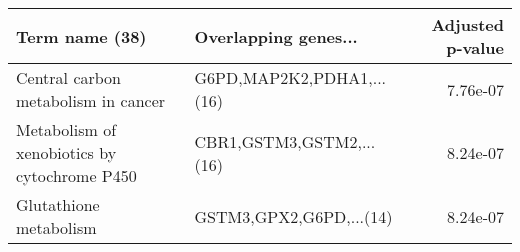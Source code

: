 \begin{tabular}{llr}
\toprule
                              Term name (38) &      Overlapping genes... &  Adjusted p-value \\
\midrule
         Central carbon metabolism in cancer & G6PD,MAP2K2,PDHA1,...(16) &          7.76e-07 \\
Metabolism of xenobiotics by cytochrome P450 &  CBR1,GSTM3,GSTM2,...(16) &          8.24e-07 \\
                      Glutathione metabolism &   GSTM3,GPX2,G6PD,...(14) &          8.24e-07 \\
\bottomrule
\end{tabular}
